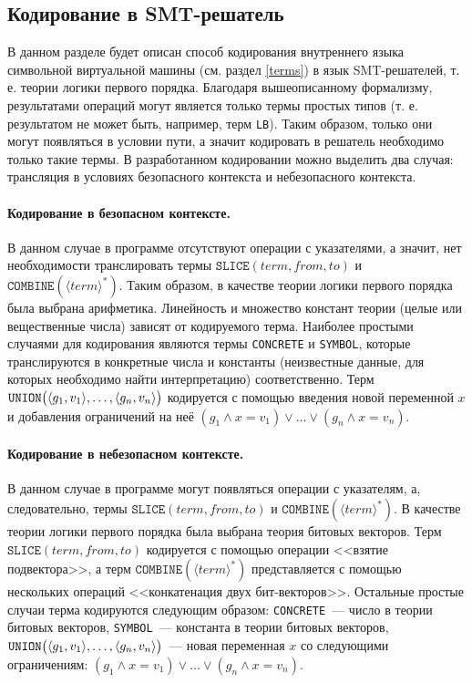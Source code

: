 \subsection{Кодирование в SMT-решатель}

В данном разделе будет описан способ кодирования внутреннего языка символьной виртуальной машины (см. раздел \ref{terms}) в язык SMT-решателей, т. е. теории логики первого порядка. Благодаря вышеописанному формализму, результатами операций могут является только термы простых типов (т. е. результатом не может быть, например, терм \texttt{LB}). Таким образом, только они могут появляться в условии пути, а значит кодировать в решатель необходимо только такие термы. В разработанном кодировании можно выделить два случая: трансляция в условиях безопасного контекста и небезопасного контекста.

\paragraph{Кодирование в безопасном контексте.} В данном случае в программе отсутствуют операции с указателями, а значит, нет необходимости транслировать термы $\texttt{SLICE}(term, from, to)$ и $\texttt{COMBINE}(\langle term \rangle ^*)$. Таким образом, в качестве теории логики первого порядка была выбрана арифметика. Линейность и множество констант теории (целые или вещественные числа) зависят от кодируемого терма. Наиболее простыми случаями для кодирования являются термы \texttt{CONCRETE} и \texttt{SYMBOL}, которые транслируются в конкретные числа и константы (неизвестные данные, для которых необходимо найти интерпретацию) соответственно. Терм $\texttt{UNION}\big(\langle g_1, v_1\rangle,\ldots,\langle g_n, v_n\rangle\big)$ кодируется с помощью введения новой переменной $x$ и добавления ограничений на неё $(g_1 \land x = v_1) \lor \ldots \lor (g_n \land x = v_n)$.

\paragraph{Кодирование в небезопасном контексте.} В данном случае в программе могут появляться операции с указателям, а, следовательно, термы $\texttt{SLICE}(term, from, to)$ и $\texttt{COMBINE}(\langle term \rangle ^*)$. В качестве теории логики первого порядка была выбрана теория битовых векторов. Терм $\texttt{SLICE}(term, from, to)$ кодируется с помощью операции <<взятие подвектора>>, а терм $\texttt{COMBINE}(\langle term \rangle ^*)$ представляется с помощью нескольких операций <<конкатенация двух бит-векторов>>. Остальные простые случаи терма кодируются следующим образом: \texttt{CONCRETE}~--- число в теории битовых векторов, \texttt{SYMBOL}~--- константа в теории битовых векторов,  $\texttt{UNION}\big(\langle g_1, v_1\rangle,\ldots,\langle g_n, v_n\rangle\big)$~--- новая переменная $x$ со следующими ограничениям: $(g_1 \land x = v_1) \lor \ldots \lor (g_n \land x = v_n)$.
